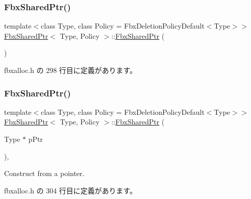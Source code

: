\subsubsection{\texorpdfstring{Fbx\+Shared\+Ptr()}{FbxSharedPtr()}\hspace{0.1cm}{\footnotesize\ttfamily [1/3]}}
{\footnotesize\ttfamily template$<$class Type, class Policy = Fbx\+Deletion\+Policy\+Default$<$\+Type$>$$>$ \\
\hyperlink{class_fbx_shared_ptr}{Fbx\+Shared\+Ptr}$<$ Type, Policy $>$\+::\hyperlink{class_fbx_shared_ptr}{Fbx\+Shared\+Ptr} (\begin{DoxyParamCaption}{ }\end{DoxyParamCaption})\hspace{0.3cm}{\ttfamily [inline]}}



 fbxalloc.\+h の 298 行目に定義があります。

\mbox{\label{class_fbx_shared_ptr_a694b2cfd410b1e18b87d697f30518af8}} 
\subsubsection{\texorpdfstring{Fbx\+Shared\+Ptr()}{FbxSharedPtr()}\hspace{0.1cm}{\footnotesize\ttfamily [2/3]}}
{\footnotesize\ttfamily template$<$class Type, class Policy = Fbx\+Deletion\+Policy\+Default$<$\+Type$>$$>$ \\
\hyperlink{class_fbx_shared_ptr}{Fbx\+Shared\+Ptr}$<$ Type, Policy $>$\+::\hyperlink{class_fbx_shared_ptr}{Fbx\+Shared\+Ptr} (\begin{DoxyParamCaption}\item[{Type $\ast$}]{p\+Ptr }\end{DoxyParamCaption})\hspace{0.3cm}{\ttfamily [inline]}, {\ttfamily [explicit]}}



Construct from a pointer. 



 fbxalloc.\+h の 304 行目に定義があります。

\mbox{\label{class_fbx_shared_ptr_a7e6b1c33f8f837c6389ba99f88faafff}} 
